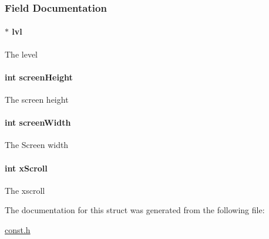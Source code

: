 \subsubsection{Field Documentation}
\hypertarget{struct_map_abca19b7de8e60347a507d1aeff95c764}{
\paragraph[{lvl}]{$\ast$ lvl}}\label{struct_map_abca19b7de8e60347a507d1aeff95c764}
The level \hypertarget{struct_map_a9ebc1dbd77788c4bfa27758a6725413f}{
\paragraph[{screen\-Height}]{\setlength{\rightskip}{0pt plus 5cm}int screen\-Height}}\label{struct_map_a9ebc1dbd77788c4bfa27758a6725413f}
The screen height \hypertarget{struct_map_ae50cb92a78d9e0a4f4bd718fc02bd294}{
\paragraph[{screen\-Width}]{\setlength{\rightskip}{0pt plus 5cm}int screen\-Width}}\label{struct_map_ae50cb92a78d9e0a4f4bd718fc02bd294}
The Screen width \hypertarget{struct_map_aa83bbdf2603e42824cd0bab44bf315c2}{
\paragraph[{x\-Scroll}]{\setlength{\rightskip}{0pt plus 5cm}int x\-Scroll}}\label{struct_map_aa83bbdf2603e42824cd0bab44bf315c2}
The xscroll 

The documentation for this struct was generated from the following file\-:\begin{DoxyCompactItemize}
\item 
\hyperlink{const_8h}{const.\-h}\end{DoxyCompactItemize}

